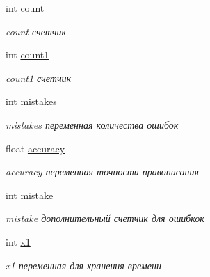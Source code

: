 \begin{DoxyCompactItemize}
int \mbox{\hyperlink{class_main_window_a56d8727651a8b002ebff58e79e5ef26f}{count}}
\begin{DoxyCompactList}\small\item\em count счетчик \end{DoxyCompactList}\item 
\mbox{\label{class_main_window_ace70d1f0e333024d8354bb3e479a8d5d}} 
int \mbox{\hyperlink{class_main_window_ace70d1f0e333024d8354bb3e479a8d5d}{count1}}
\begin{DoxyCompactList}\small\item\em count1 счетчик \end{DoxyCompactList}\item 
\mbox{\label{class_main_window_afa0521da6ab5e5e75989cd8624ccdefe}} 
int \mbox{\hyperlink{class_main_window_afa0521da6ab5e5e75989cd8624ccdefe}{mistakes}}
\begin{DoxyCompactList}\small\item\em mistakes переменная количества ошибок \end{DoxyCompactList}\item 
\mbox{\label{class_main_window_abb3f1bc705e4bf8c4bf96a327922da6c}} 
float \mbox{\hyperlink{class_main_window_abb3f1bc705e4bf8c4bf96a327922da6c}{accuracy}}
\begin{DoxyCompactList}\small\item\em accuracy переменная точности правописания \end{DoxyCompactList}\item 
\mbox{\label{class_main_window_ad3746552dfa93ee3938ea73d268f4421}} 
int \mbox{\hyperlink{class_main_window_ad3746552dfa93ee3938ea73d268f4421}{mistake}}
\begin{DoxyCompactList}\small\item\em mistake дополнительный счетчик для ошибкок \end{DoxyCompactList}\item 
\mbox{\label{class_main_window_a3cc8a103182ec24e06ce1b53b20afa26}} 
int \mbox{\hyperlink{class_main_window_a3cc8a103182ec24e06ce1b53b20afa26}{x1}}
\begin{DoxyCompactList}\small\item\em x1 переменная для хранения времени \end{DoxyCompactList}\item 

\end{DoxyCompactItemize}
